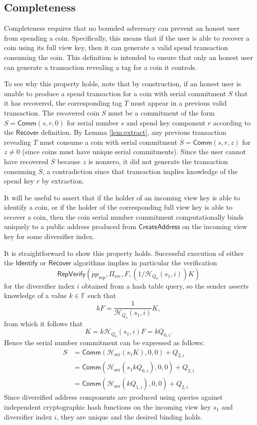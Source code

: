 \documentclass{llncs}
\newcommand{\F}{\mathbb{F}}
\newcommand{\hash}{\mathcal{H}}
\newcommand{\func}[1]{\mathsf{#1}}
\newcommand{\comm}{\func{Comm}}
\begin{document}
\subsection{Completeness}

Completeness requires that no bounded adversary can prevent an honest user from spending a coin.
Specifically, this means that if the user is able to recover a coin using its full view key, then it can generate a valid spend transaction consuming the coin.
This definition is intended to ensure that only an honest user can generate a transaction revealing a tag for a coin it controls.

To see why this property holds, note that by construction, if an honest user is unable to produce a spend transaction for a coin with serial commitment $S$ that it has recovered, the corresponding tag $T$ must appear in a previous valid transaction.
The recovered coin $S$ must be a commitment of the form $S = \comm(s,r,0)$ for serial number $s$ and spend key component $r$ according to the $\func{Recover}$ definition.
By Lemma \ref{lem:extract}, any previous transaction revealing $T$ must consume a coin with serial commitment $\overline{S} = \comm(s,r,z)$ for $z \neq 0$ (since coins must have unique serial commitments).
Since the user cannot have recovered $\overline{S}$ because $z$ is nonzero, it did not generate the transaction consuming $\overline{S}$, a contradiction since that transaction implies knowledge of the spend key $r$ by extraction.

\begin{remark}
\label{rmk:janus}
It will be useful to assert that if the holder of an incoming view key is able to identify a coin, or if the holder of the corresponding full view key is able to recover a coin, then the coin serial number commitment computationally binds uniquely to a public address produced from $\func{CreateAddress}$ on the incoming view key for some diversifier index.

It is straightforward to show this property holds.
Successful execution of either the $\func{Identify}$ or $\func{Recover}$ algorithms implies in particular the verification $$\func{RepVerify}(pp_{\text{rep}},\Pi_{\text{rec}},F,(1/\hash_{Q_0}(s_1,i))K)$$ for the diversifier index $i$ obtained from a hash table query, so the sender asserts knowledge of a value $k \in \F$ such that $$kF = \frac{1}{\hash_{Q_0}(s_1,i)}K,$$ from which it follows that
$$K = k\hash_{Q_0}(s_1,i)F = kQ_{0,i}.$$
Hence the serial number commitment can be expressed as follows:
\begin{align*}
S &= \comm(\hash_{\text{ser}}(s_1 K), 0, 0) + Q_{2,i} \\
&= \comm(\hash_{\text{ser}}(s_1 kQ_{0,i}), 0, 0) + Q_{2,i} \\
&= \comm(\hash_{\text{ser}}(kQ_{1,i}), 0, 0) + Q_{2,i}
\end{align*}
Since diversified address components are produced using queries against independent cryptographic hash functions on the incoming view key $s_1$ and diversifier index $i$, they are unique and the desired binding holds.
\end{remark}
\end{document}

